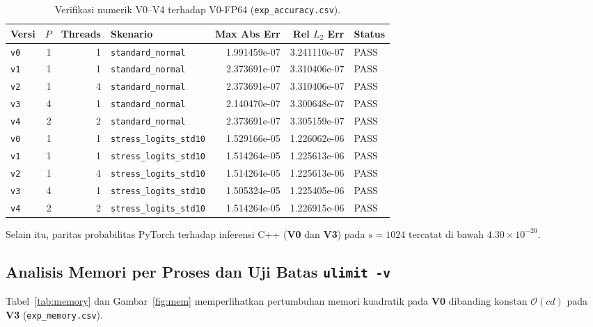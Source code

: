 \documentclass[11pt,a4paper]{article}
\begin{document}
\begin{table}[H]
\centering
\caption{Verifikasi numerik V0--V4 terhadap V0-FP64 (\texttt{exp\_accuracy.csv}).}
\label{tab:accuracy}
\begin{tabular}{lrrlrrl}
\toprule
\textbf{Versi} & \textbf{$P$} & \textbf{Threads} & \textbf{Skenario} & \textbf{Max Abs Err} & \textbf{Rel $L_2$ Err} & \textbf{Status} \\
\midrule
\texttt{v0} & 1 & 1 & \texttt{standard\_normal} & 1.991459e-07 & 3.241110e-07 & PASS \\
\texttt{v1} & 1 & 1 & \texttt{standard\_normal} & 2.373691e-07 & 3.310406e-07 & PASS \\
\texttt{v2} & 1 & 4 & \texttt{standard\_normal} & 2.373691e-07 & 3.310406e-07 & PASS \\
\texttt{v3} & 4 & 1 & \texttt{standard\_normal} & 2.140470e-07 & 3.300648e-07 & PASS \\
\texttt{v4} & 2 & 2 & \texttt{standard\_normal} & 2.373691e-07 & 3.305159e-07 & PASS \\
\texttt{v0} & 1 & 1 & \texttt{stress\_logits\_std10} & 1.529166e-05 & 1.226062e-06 & PASS \\
\texttt{v1} & 1 & 1 & \texttt{stress\_logits\_std10} & 1.514264e-05 & 1.225613e-06 & PASS \\
\texttt{v2} & 1 & 4 & \texttt{stress\_logits\_std10} & 1.514264e-05 & 1.225613e-06 & PASS \\
\texttt{v3} & 4 & 1 & \texttt{stress\_logits\_std10} & 1.505324e-05 & 1.225405e-06 & PASS \\
\texttt{v4} & 2 & 2 & \texttt{stress\_logits\_std10} & 1.514264e-05 & 1.226915e-06 & PASS \\
\bottomrule
\end{tabular}
\end{table}

Selain itu, paritas probabilitas PyTorch terhadap inferensi C++ (\textbf{V0} dan \textbf{V3}) pada $s=1024$ tercatat di bawah $4.30 \times 10^{-20}$.

\subsection{Analisis Memori per Proses dan Uji Batas \texorpdfstring{\texttt{ulimit -v}}{ulimit -v}}
Tabel~\ref{tab:memory} dan Gambar~\ref{fig:mem} memperlihatkan pertumbuhan memori kuadratik pada \textbf{V0} dibanding konstan $\mathcal{O}(cd)$ pada \textbf{V3} (\texttt{exp\_memory.csv}).
\end{document}
